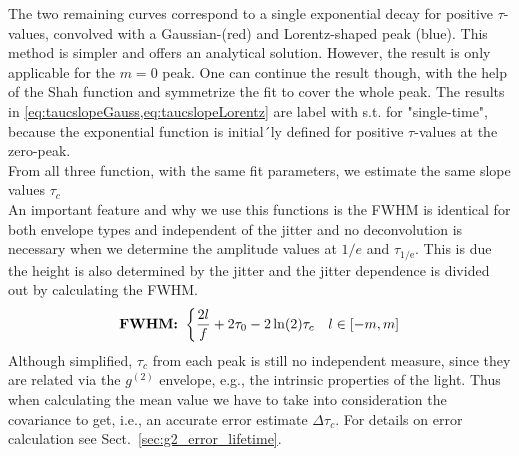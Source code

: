 The two remaining curves correspond to a single exponential decay for positive $\tau$-values, convolved with a Gaussian-(red) and Lorentz-shaped peak (blue). This method is simpler and offers an analytical solution. However, the result is only applicable for the $m=0$ peak. One can continue the result though, with the help of the Shah function and symmetrize the fit to cover the whole peak. The results in \cref{eq:taucslopeGauss,eq:taucslopeLorentz} are label with s.t. for "single-time", because the exponential function is initial´ly defined for positive $\tau$-values at the zero-peak.\\
From all three function, with the same fit parameters, we estimate the same slope values $\tau_c$\\
An important feature and why we use this functions is the \ac{FWHM} is identical for both envelope types and independent of the jitter and no deconvolution is necessary when we determine the amplitude values at $1/e$ and $\tau_\mathrm{1/e}$. This is due the height is also determined by the jitter and the jitter dependence is divided out by calculating the \ac{FWHM}.
\begin{equation}\label{eq:lifetimeFWHM}
	\textrm{\textbf{FWHM: }} \begin{cases}
		\dfrac{2l}{f}+2\tau_0- 2\ln(2)\tau_c & l\in[-m,m] \\
	\end{cases}
\end{equation}
Although simplified, $\tau_c$ from each peak is still no independent measure, since they are related via the $g^{(2)}$ envelope, e.g., the intrinsic properties of the light. Thus when calculating the mean value we have to take into consideration the covariance to get, i.e., an accurate error estimate $\Delta \tau_c$. For details on error calculation see Sect.~\cref{sec:g2_error_lifetime}.


